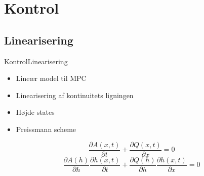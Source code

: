 \section{Kontrol}
\subsection{Linearisering}
\begin{frame}{Kontrol}{Linearisering}
 \vfill\vfill\centering    
\begin{itemize}
	\item Lineær model til MPC\vspace{5mm}
	\item Linearisering af kontinuitets ligningen \vspace{5mm}
	\item Højde states \vspace{5mm}
	\item Preissmann scheme \vspace{5mm}
\end{itemize}
\begin{equation*}\label{eq:linearization_Continuity}
\frac{\partial A(x,t)}{\partial t} + \frac{\partial Q(x,t)}{\partial x}=0
\end{equation*}\vspace{5mm}
\begin{equation*}
	\frac{\partial A(h)}{\partial h}\frac{\partial h(x,t)}{\partial t} + \frac{\partial Q(h)}{\partial h}\frac{\partial h(x,t)}{\partial x}=0
\end{equation*}
\vfill\vfill
\end{frame}

